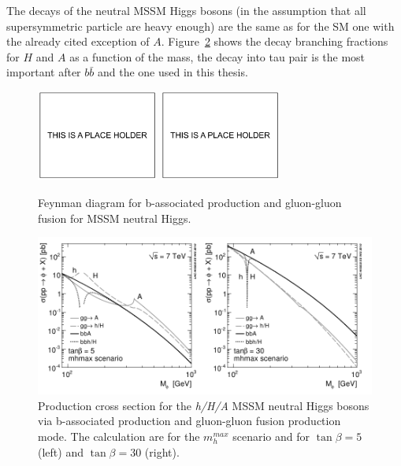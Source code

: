 The decays of the neutral
MSSM Higgs bosons (in the assumption that all supersymmetric particle
are heavy enough) are the same as for the SM one with the already
cited exception of $A$. Figure~\ref{fig:xsec} shows the decay branching fractions
for $H$ and $A$ as a function of the mass, 
the decay into tau pair is the most important after $b\bar{b}$ and the one used in this thesis. 


\begin{figure}[tp]
     \begin{center}

            \includegraphics[height=3cm]{figure/blank.pdf}
            \includegraphics[height=3cm]{figure/blank.pdf}

    \end{center}
    \caption{Feynman diagram for b-associated production and gluon-gluon fusion for MSSM neutral Higgs.}
   \label{fig:prod}
\end{figure}

\begin{figure}[tp]
     \begin{center}

            \includegraphics[width=\textwidth]{figure/xsec.png}

    \end{center}
    \caption{Production cross section for the \emph{h/H/A} MSSM neutral Higgs bosons via b-associated production and
	gluon-gluon fusion production mode. The calculation are for the $m_h^{max}$ scenario and for $\tan \beta=5$ (left) and $\tan \beta=30$ (right).}
   \label{fig:xsec}
\end{figure}




